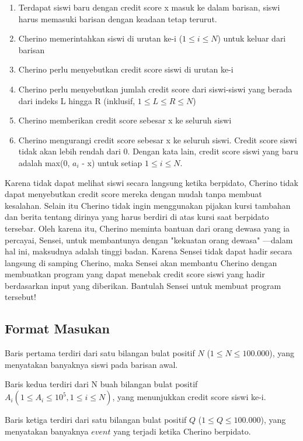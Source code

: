 \documentclass{article}
\begin{document}
\begin{enumerate}
    \item Terdapat siswi baru dengan credit score x masuk ke dalam barisan, siswi harus memasuki barisan dengan keadaan tetap terurut.
    \item Cherino memerintahkan siswi di urutan ke-i ($1 \leq i \leq N$) untuk keluar dari barisan
    \item Cherino perlu menyebutkan credit score siswi di urutan ke-i
    \item Cherino perlu menyebutkan jumlah credit score dari siswi-siswi yang berada dari indeks L hingga R (inklusif, $1 \leq L \leq R \leq N$)
    \item Cherino memberikan credit score sebesar x ke seluruh siswi
    \item Cherino mengurangi credit score sebesar x ke seluruh siswi. Credit score siswi tidak akan lebih rendah dari 0. Dengan kata lain, credit score siswi yang baru adalah max(0, $a_i$ - x) untuk setiap $1 \leq i \leq N$.
\end{enumerate}

Karena tidak dapat melihat siswi secara langsung ketika berpidato, Cherino tidak dapat menyebutkan credit score mereka dengan mudah tanpa membuat kesalahan. Selain itu Cherino tidak ingin menggunakan pijakan kursi tambahan dan berita tentang dirinya yang harus berdiri di atas kursi saat berpidato tersebar. Oleh karena itu, Cherino meminta bantuan dari orang dewasa yang ia percayai, Sensei, untuk membantunya dengan "kekuatan orang dewasa" —dalam hal ini, maksudnya adalah tinggi badan. Karena Sensei tidak dapat hadir secara langsung di samping Cherino, maka Sensei akan membantu Cherino dengan membuatkan program yang dapat menebak credit score siswi yang hadir berdasarkan input yang diberikan. Bantulah Sensei untuk membuat program tersebut!

\pagebreak
\subsection*{Format Masukan}

Baris pertama terdiri dari satu bilangan bulat positif $N$ ($1 \leq N \leq 100.000$), yang menyatakan banyaknya siswi pada barisan awal.

Baris kedua terdiri dari N buah bilangan bulat positif $A_i (1 \leq A_i \leq 10^5, 1 \leq i \leq N)$, yang menunjukkan credit score siswi ke-i.

Baris ketiga terdiri dari satu bilangan bulat positif $Q$ ($1 \leq Q \leq 100.000$), yang menyatakan banyaknya $event$ yang terjadi ketika Cherino berpidato.\\
\end{document}
